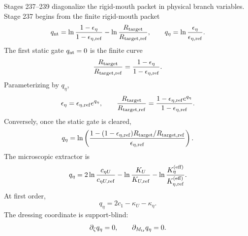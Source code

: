 Stages 237--239 diagonalize the rigid-mouth packet in physical branch variables.  Stage 237 begins from the finite rigid-mouth packet
\begin{equation}
\label{eq:part07-rm-finite-packet}
q_{\rm nt}=\ln\frac{1-\epsilon_\eta}{1-\epsilon_{\eta,\rm ref}}
-
\ln\frac{R_{\rm target}}{R_{\rm target,ref}},
\qquad
q_\eta=\ln\frac{\epsilon_\eta}{\epsilon_{\eta,\rm ref}}.
\end{equation}
The first static gate \(q_{\rm nt}=0\) is the finite curve
\begin{equation}
\label{eq:part07-static-blind-curve}
\frac{R_{\rm target}}{R_{\rm target,ref}}
=
\frac{1-\epsilon_\eta}{1-\epsilon_{\eta,\rm ref}}.
\end{equation}
Parameterizing by \(q_\eta\),
\begin{equation}
\label{eq:part07-static-blind-curve-qeta}
\epsilon_\eta=\epsilon_{\eta,\rm ref}e^{q_\eta},
\qquad
\frac{R_{\rm target}}{R_{\rm target,ref}}
=
\frac{1-\epsilon_{\eta,\rm ref}e^{q_\eta}}{1-\epsilon_{\eta,\rm ref}}.
\end{equation}
Conversely, once the static gate is cleared,
\begin{equation}
\label{eq:part07-qeta-from-rtarget}
q_\eta=
\ln\left(
\frac{1-(1-\epsilon_{\eta,\rm ref})R_{\rm target}/R_{\rm target,ref}}
{\epsilon_{\eta,\rm ref}}
\right).
\end{equation}
The microscopic extractor is
\begin{equation}
\label{eq:part07-qeta-micro-finite}
q_\eta
=2\ln\frac{c_{\eta U}}{c_{\eta U,\rm ref}}
-
\ln\frac{K_U}{K_{U,\rm ref}}
-
\ln\frac{K_\eta^{(\rm eff)}}{K_{\eta,\rm ref}^{(\rm eff)}}.
\end{equation}
At first order,
\begin{equation}
\label{eq:part07-qeta-first-order}
q_\eta=2c_1-\kappa_U-\kappa_\eta.
\end{equation}
The dressing coordinate is support-blind:
\begin{equation}
\label{eq:part07-qeta-support-blind}
\partial_\zeta q_\eta=0,
\qquad
\partial_{M_{\rm tr}}q_\eta=0.
\end{equation}

